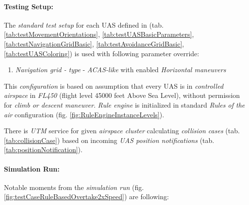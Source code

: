     \paragraph{Testing Setup:} The \emph{standard test setup} for each UAS defined in (tab. \ref{tab:testMovementOrientations}, \ref{tab:testUASBasicParameters}, \ref{tab:testNavigationGridBasic}, \ref{tab:testAvoidanceGridBasic}, \ref{tab:testUASColoring}) is used with following parameter override:
    \begin{enumerate}
        \item \emph{Navigation grid - type} - \emph{ACAS-like} with enabled \emph{Horizontal maneuvers}
    \end{enumerate}
    
    This \emph{configuration} is based on assumption that every UAS is in \emph{controlled airspace} in \emph{FL450} (flight level 45000 feet Above Sea Level), without permission for \emph{climb or descent maneuver}. \emph{Rule engine} is initialized in standard \emph{Rules of the air} configuration (fig. \ref{fig:RuleEngineInstanceLevels}).
    
    There is \emph{UTM} service for given \emph{airspace cluster} calculating \emph{collision cases} (tab. \ref{tab:collisionCase}) based on incoming \emph{UAS position notifications} (tab. \ref{tab:positionNotification}).
    
    
    \paragraph{Simulation Run:} Notable moments from the \emph{simulation run} (fig. \ref{fig:testCaseRuleBasedOvertake2xSpeed}) are following:
    
